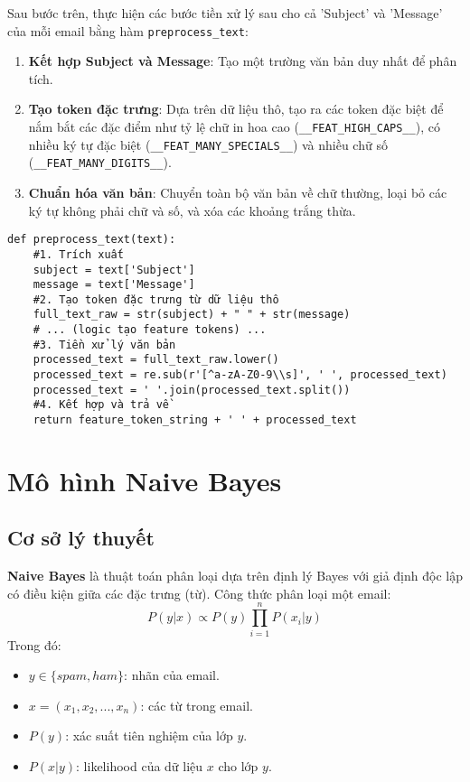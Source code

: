 Sau bước trên, thực hiện các bước tiền xử lý sau cho cả 'Subject' và 'Message' của mỗi email bằng hàm \texttt{preprocess\_text}:
\begin{enumerate}
    \item \textbf{Kết hợp Subject và Message}: Tạo một trường văn bản duy nhất để phân tích.
    \item \textbf{Tạo token đặc trưng}: Dựa trên dữ liệu thô, tạo ra các token đặc biệt để nắm bắt các đặc điểm như tỷ lệ chữ in hoa cao (\texttt{\_\_FEAT\_HIGH\_CAPS\_\_}), có nhiều ký tự đặc biệt (\texttt{\_\_FEAT\_MANY\_SPECIALS\_\_}) và nhiều chữ số (\texttt{\_\_FEAT\_MANY\_DIGITS\_\_}).
    \item \textbf{Chuẩn hóa văn bản}: Chuyển toàn bộ văn bản về chữ thường, loại bỏ các ký tự không phải chữ và số, và xóa các khoảng trắng thừa.
\end{enumerate}

\begin{verbatim}
def preprocess_text(text):
    #1. Trích xuất
    subject = text['Subject']
    message = text['Message']
    #2. Tạo token đặc trưng từ dữ liệu thô
    full_text_raw = str(subject) + " " + str(message)
    # ... (logic tạo feature tokens) ...
    #3. Tiền xử lý văn bản
    processed_text = full_text_raw.lower()
    processed_text = re.sub(r'[^a-zA-Z0-9\\s]', ' ', processed_text)
    processed_text = ' '.join(processed_text.split())
    #4. Kết hợp và trả về
    return feature_token_string + ' ' + processed_text
\end{verbatim}



\section{Mô hình Naive Bayes}

\subsection{Cơ sở lý thuyết}
\textbf{Naive Bayes} là thuật toán phân loại dựa trên định lý Bayes với giả định độc lập có điều kiện giữa các đặc trưng (từ). Công thức phân loại một email:
$$P(y|x) \propto P(y) \prod_{i=1}^{n} P(x_i|y)$$
Trong đó:
\begin{itemize}
    \item $y \in \{spam, ham\}$: nhãn của email.
    \item $x = (x_1, x_2, ..., x_n)$: các từ trong email.
    \item $P(y)$: xác suất tiên nghiệm của lớp $y$.
    \item $P(x|y)$: likelihood của dữ liệu $x$ cho lớp $y$.
\end{itemize}

